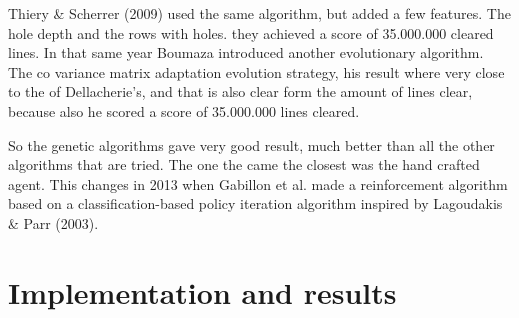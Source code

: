 \documentclass{report}
\begin{document}
Thiery \& Scherrer (2009) used the same algorithm, but added a few features. The hole depth and the rows with holes. they achieved a score of 35.000.000 cleared lines. In that same year Boumaza introduced another evolutionary algorithm. The co variance matrix adaptation evolution strategy, his result where very close to the of Dellacherie's, and that is also clear form the amount of lines clear, because also he scored a score of 35.000.000 lines cleared.

So the genetic algorithms gave very good result, much better than all the other algorithms that are tried. The one the came the closest was the hand crafted agent. This changes in 2013 when Gabillon et al. made a reinforcement algorithm based on a classification-based policy iteration algorithm inspired by Lagoudakis \& Parr (2003).

\chapter{Implementation and results}
\end{document}
